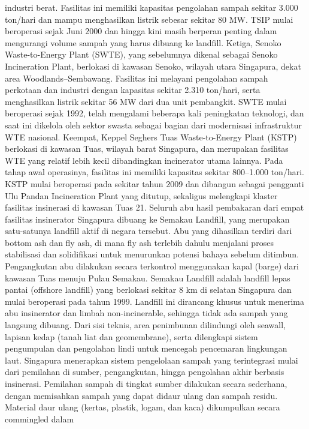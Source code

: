 \documentclass[
  letterpaper,
  DIV=11,
  numbers=noendperiod]{scrreprt}
\begin{document}
industri berat. Fasilitas ini memiliki kapasitas pengolahan sampah
sekitar 3.000 ton/hari dan mampu menghasilkan listrik sebesar sekitar 80
MW. TSIP mulai beroperasi sejak Juni 2000 dan hingga kini masih berperan
penting dalam mengurangi volume sampah yang harus dibuang ke landfill.
Ketiga, Senoko Waste-to-Energy Plant (SWTE), yang sebelumnya dikenal
sebagai Senoko Incineration Plant, berlokasi di kawasan Senoko, wilayah
utara Singapura, dekat area Woodlands--Sembawang. Fasilitas ini melayani
pengolahan sampah perkotaan dan industri dengan kapasitas sekitar 2.310
ton/hari, serta menghasilkan listrik sekitar 56 MW dari dua unit
pembangkit. SWTE mulai beroperasi sejak 1992, telah mengalami beberapa
kali peningkatan teknologi, dan saat ini dikelola oleh sektor swasta
sebagai bagian dari modernisasi infrastruktur WTE nasional. Keempat,
Keppel Seghers Tuas Waste-to-Energy Plant (KSTP) berlokasi di kawasan
Tuas, wilayah barat Singapura, dan merupakan fasilitas WTE yang relatif
lebih kecil dibandingkan incinerator utama lainnya. Pada tahap awal
operasinya, fasilitas ini memiliki kapasitas sekitar 800--1.000
ton/hari. KSTP mulai beroperasi pada sekitar tahun 2009 dan dibangun
sebagai pengganti Ulu Pandan Incineration Plant yang ditutup, sekaligus
melengkapi klaster fasilitas insinerasi di kawasan Tuas 21. Seluruh abu
hasil pembakaran dari empat fasilitas insinerator Singapura dibuang ke
Semakau Landfill, yang merupakan satu-satunya landfill aktif di negara
tersebut. Abu yang dihasilkan terdiri dari bottom ash dan fly ash, di
mana fly ash terlebih dahulu menjalani proses stabilisasi dan
solidifikasi untuk menurunkan potensi bahaya sebelum ditimbun.
Pengangkutan abu dilakukan secara terkontrol menggunakan kapal (barge)
dari kawasan Tuas menuju Pulau Semakau. Semakau Landfill adalah landfill
lepas pantai (offshore landfill) yang berlokasi sekitar 8 km di selatan
Singapura dan mulai beroperasi pada tahun 1999. Landfill ini dirancang
khusus untuk menerima abu insinerator dan limbah non-incinerable,
sehingga tidak ada sampah yang langsung dibuang. Dari sisi teknis, area
penimbunan dilindungi oleh seawall, lapisan kedap (tanah liat dan
geomembrane), serta dilengkapi sistem pengumpulan dan pengolahan lindi
untuk mencegah pencemaran lingkungan laut. Singapura menerapkan sistem
pengelolaan sampah yang terintegrasi mulai dari pemilahan di sumber,
pengangkutan, hingga pengolahan akhir berbasis insinerasi. Pemilahan
sampah di tingkat sumber dilakukan secara sederhana, dengan memisahkan
sampah yang dapat didaur ulang dan sampah residu. Material daur ulang
(kertas, plastik, logam, dan kaca) dikumpulkan secara commingled dalam
\end{document}

